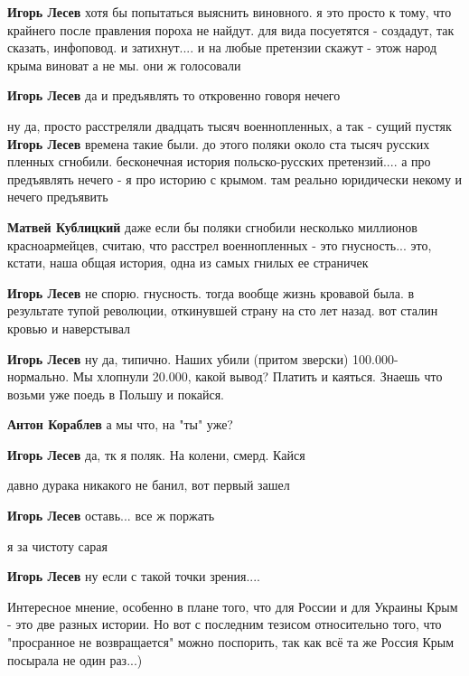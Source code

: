 \begin{itemize}
\begin{itemize}
\textbf{Игорь Лесев} хотя бы попытаться выяснить виновного. я это просто к тому, что крайнего после правления пороха не найдут. для вида посуетятся - создадут, так сказать, инфоповод. и затихнут.... и на любые претензии скажут - этож народ крыма виноват а не мы. они ж голосовали

\textbf{Игорь Лесев} да и предъявлять то откровенно говоря нечего

ну да, просто расстреляли двадцать тысяч военнопленных, а так - сущий пустяк
\textbf{Игорь Лесев} времена такие были. до этого поляки около ста тысяч русских пленных сгнобили. бесконечная история польско-русских претензий.... а про предъявлять нечего - я про историю с крымом. там реально юридически некому и нечего предъявить

\textbf{Матвей Кублицкий} даже если бы поляки сгнобили несколько миллионов красноармейцев, считаю, что расстрел военнопленных - это гнусность... это, кстати, наша общая история, одна из самых гнилых ее страничек

\textbf{Игорь Лесев} не спорю. гнусность. тогда вообще жизнь кровавой была. в результате тупой революции, откинувшей страну на сто лет назад. вот сталин кровью и наверстывал

\textbf{Игорь Лесев} ну да, типично. Наших убили (притом зверски) 100.000- нормально. Мы хлопнули 20.000, какой вывод? Платить и каяться.
Знаешь что возьми уже поедь в Польшу и покайся.

\textbf{Антон Кораблев} а мы что, на "ты" уже?

\textbf{Игорь Лесев} да, тк я поляк. На колени, смерд. Кайся

давно дурака никакого не банил, вот первый зашел

\textbf{Игорь Лесев} оставь... все ж поржать

я за чистоту сарая

\textbf{Игорь Лесев} ну если с такой точки зрения....

\end{itemize} %


Интересное мнение, особенно в плане того, что для России и для Украины Крым -
это две разных истории. Но вот с последним тезисом относительно того, что
"просранное не возвращается" можно поспорить, так как всё та же Россия Крым
посырала не один раз...)


\end{itemize}
